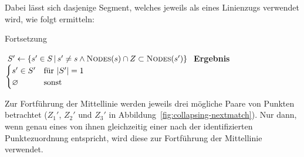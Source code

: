 \documentclass[../main/thesis.tex]{subfiles}
\begin{document}

Dabei lässt sich dasjenige Segment, welches jeweils als  eines Linienzugs verwendet wird, wie folgt ermitteln: \nopagebreak

\begin{algorithmhere}{Fortsetzung}
\label{alg:Fortsetzung}
\begin{algorithmic}
	\State $S' \gets \Set{s' \in S \SetCond s' \neq s \wedge \textproc{Nodes}(s) \cap Z \subset \textproc{Nodes}(s')}$
	\State \textbf{Ergebnis} $\begin{cases}s' \in S' & \text{für } |S'| = 1\\\varnothing & \text{sonst}\end{cases}$
\EndFunction
\end{algorithmic}
\end{algorithmhere}

Zur Fortführung der Mittellinie werden jeweils drei mögliche Paare von Punkten betrachtet ($Z_1'$, $Z_2'$ und $Z_3'$ in Abbildung~\ref{fig:collapsing-nextmatch}). Nur dann, wenn genau eines von ihnen gleichzeitig einer nach der  identifizierten Punktezuordnung entspricht, wird diese zur Fortführung der Mittellinie verwendet.

\end{document}

